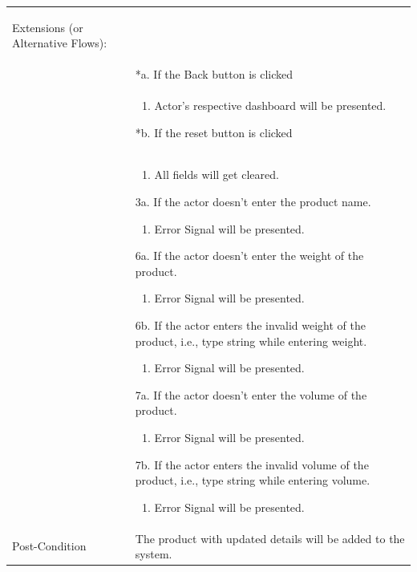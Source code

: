 \documentclass[12pt,a4paper]{article}
\begin{document}
\begin{longtable}{| p{3cm}|p{12cm}|}
\begin{enumerate}
\end{enumerate}

Extensions (or Alternative Flows):\\
& *a. If the Back button is clicked \\
& \begin{enumerate}
		\item Actor's respective dashboard will be presented.
	\end{enumerate}
*b. If the reset button is clicked \\
&	\begin{enumerate}
		\item All fields will get cleared.
	\end{enumerate}
3a. If the actor doesn't enter the product name.
 	\begin{enumerate}
		\item Error Signal will be presented.
	\end{enumerate}
6a. If the actor doesn't enter the weight of the product.
 	\begin{enumerate}
		\item Error Signal will be presented.
	\end{enumerate}
6b. If the actor enters the invalid weight of the product, i.e., type string while entering weight.
 	\begin{enumerate}
		\item Error Signal will be presented.
	\end{enumerate}
7a. If the actor doesn't enter the volume of the product.
 	\begin{enumerate}
		\item Error Signal will be presented.
	\end{enumerate}
7b. If the actor enters the invalid volume of the product, i.e., type string while entering volume.
 	\begin{enumerate}
		\item Error Signal will be presented.
	\end{enumerate}
\\ \hline
Post-Condition &    The product with updated details will be added to the system.\\ \hline

\end{longtable}


\end{document}

